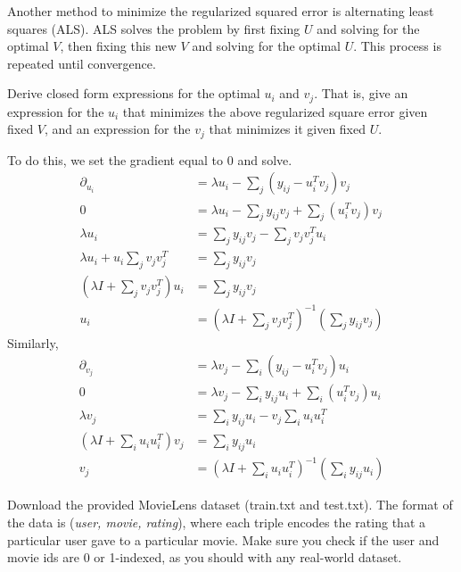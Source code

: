 \newpage

\problem[5]
Another method to minimize the regularized squared error is alternating least squares (ALS). ALS solves the problem by first fixing $U$ and solving for the optimal $V$, then fixing this new $V$ and solving for the optimal $U$.  This process is repeated until convergence.

Derive closed form expressions for the optimal $u_i$ and $v_j$.  That is, give an expression for the $u_i$ that minimizes the above regularized square error given fixed $V$, and an expression for the $v_j$ that minimizes it given fixed $U$.

\begin{solution}
    To do this, we set the gradient equal to 0 and solve.
    \begin{align*}
        \partial_{u_i} &= \lambda u_i - \sum_j (y_{ij} - u_i^T v_j) v_j\\
        0 &= \lambda u_i - \sum_j y_{ij} v_j + \sum_j (u_i^T v_j) v_j\\
        \lambda u_i &= \sum_j y_{ij} v_j - \sum_j v_j v_j^T u_i\\
        \lambda u_i + u_i \sum_j v_j v_j^T &= \sum_j y_{ij} v_j\\
        \left(\lambda I + \sum_j v_j v_j^T \right) u_i &= \sum_j y_{ij} v_j\\
        u_i &= \left( \lambda I + \sum_j v_j v_j^T \right)^{-1} \left(\sum_j y_{ij} v_j \right)
    \end{align*}
    Similarly,
    \begin{align*}
        \partial_{v_j} &= \lambda v_j - \sum_i (y_{ij} - u_i^T v_j) u_i\\
        0 &= \lambda v_j - \sum_i y_{ij} u_i + \sum_i (u_i^T v_j) u_i\\
        \lambda v_j &= \sum_i y_{ij} u_i - v_j \sum_i u_i u_i^T\\
        \left( \lambda I + \sum_i u_i u_i^T \right) v_j &=  \sum_i y_{ij} u_i\\
        v_j &= \left( \lambda I + \sum_i u_i u_i^T \right)^{-1} \left( \sum_i y_{ij} u_i \right)
    \end{align*}
\end{solution}

\newpage

\problem[10]
Download the provided MovieLens dataset (train.txt and test.txt).  The format of the data is (\emph{user, movie, rating}), where each triple encodes the rating that a particular user gave to a particular movie. Make sure you check if the user and movie ids are 0 or 1-indexed, as you should with any real-world dataset.

